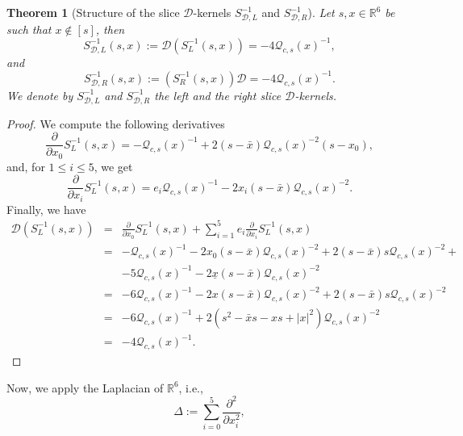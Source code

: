 \documentclass[reqno,11pt]{amsart}
\numberwithin{equation}{section}
\newcommand{\bigD}{\mathcal{D}}
\newtheorem{theorem}{Theorem}[section]
\theoremstyle{definition}
\begin{document}
\begin{theorem}[Structure of the slice $ \mathcal{D}$-kernels $S^{-1}_{\mathcal{D},L}$ and $S^{-1}_{\mathcal{D},R}$]
	\label{app1}
	Let $s,x \in \mathbb{R}^6$ be such that $x \notin [s]$, then
	\begin{equation}
		\label{one}
		S^{-1}_{\bigD ,L}(s,x):=\mathcal{D} \left(S^{-1}_L(s,x)\right)=-4 \mathcal{Q}_{c,s}(x)^{-1},
	\end{equation}
	and
	\begin{equation}
		\label{second}
		S^{-1}_{\bigD ,R}(s,x):=\left(S^{-1}_R(s,x)\right)\mathcal{D} =-4 \mathcal{Q}_{c,s}(x)^{-1}.
	\end{equation}
	We denote by $S^{-1}_{\mathcal{D},L}$ and $S^{-1}_{\mathcal{D},R}$ the left and the right slice $ \mathcal{D}$-kernels.
\end{theorem}
\begin{proof}
	We compute the following derivatives
	\begin{equation}
		\label{f1}
		\frac{\partial}{\partial x_0}S^{-1}_L(s,x)=- \mathcal{Q}_{c,s}(x)^{-1}+2(s- \bar{x}) \mathcal{Q}_{c,s}(x)^{-2}(s- x_0),
	\end{equation}
	and, for $1 \leq i \leq 5$, we get
	\begin{equation}
		\label{f2}
		\frac{\partial}{\partial x_i} S^{-1}_L(s,x)= e_i \mathcal{Q}_{c,s}(x)^{-1}-2 x_i (s- \bar{x}) \mathcal{Q}_{c,s}(x)^{-2}.
	\end{equation}
	Finally, we have
	\begin{eqnarray*}
		\mathcal{D} \left(S^{-1}_L(s,x)\right)&=& \frac{\partial}{\partial x_0}S^{-1}_L(s,x)+ \sum_{i=1}^5 e_i \frac{\partial}{\partial x_i} S^{-1}_L(s,x)\\
		&=& - \mathcal{Q}_{c,s}(x)^{-1}-2 x_0(s- \bar{x}) \mathcal{Q}_{c,s}(x)^{-2}+2(s- \bar{x}) s \mathcal{Q}_{c,s}(x)^{-2}+\\
		&& -5 \mathcal{Q}_{c,s}(x)^{-1}-2 \underline{x}(s- \bar{x}) \mathcal{Q}_{c,s}(x)^{-2} \\
		&=& - 6 \mathcal{Q}_{c,s}(x)^{-1}-2 x(s- \bar{x}) \mathcal{Q}_{c,s}(x)^{-2}+2(s- \bar{x}) s \mathcal{Q}_{c,s}(x)^{-2}\\
		&=&- 6 \mathcal{Q}_{c,s}(x)^{-1}+2(s^2- \bar{x}s-xs+|x|^2)\mathcal{Q}_{c,s}(x)^{-2}\\
		&=& -4 \mathcal{Q}_{c,s}(x)^{-1}.
	\end{eqnarray*}
\end{proof}
Now, we apply the Laplacian of $ \mathbb{R}^6$, i.e.,
$$ \Delta:= \sum_{i=0}^5 \frac{\partial^2}{\partial x_i^2},$$
\end{document}
